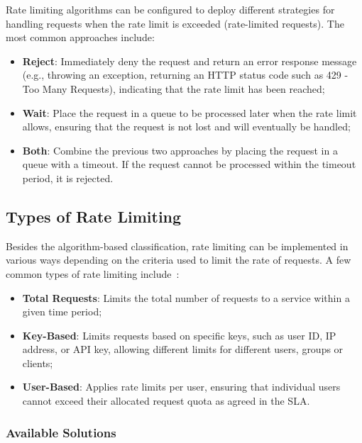 Rate limiting algorithms can be configured
to deploy different strategies for handling requests when the rate limit is exceeded
(rate-limited requests).
The most common approaches include:

\begin{itemize}
    \item \textbf{Reject}: Immediately deny the request and return an error response message (e.g., throwing an exception,
    returning an HTTP status code such as 429 - Too Many Requests), indicating that the rate limit has been reached;
    \item \textbf{Wait}: Place the request in a queue to be processed later when the rate limit allows, ensuring that the request is not lost and will eventually be handled;
    \item \textbf{Both}: Combine the previous two approaches by placing the request in a queue with a timeout.
    If the request cannot be processed within the timeout period, it is rejected.
\end{itemize}

\subsection{Types of Rate Limiting}\label{subsec:rate-limiter-types}

Besides the algorithm-based classification, rate limiting can be implemented in various ways depending on the criteria used to limit the rate of requests.
A few common types of rate limiting include~\cite{redis-rate-limiting}:
\begin{itemize}
    \item \textbf{Total Requests}: Limits the total number of requests to a service within a given time period;
    \item \textbf{Key-Based}: Limits requests based on specific keys, such as user ID, IP address, or API key,
    allowing different limits for different users, groups or clients;
    \item \textbf{User-Based}: Applies rate limits per user,
    ensuring that individual users cannot exceed their allocated request quota as agreed in the SLA.
\end{itemize}

\subsubsection{Available Solutions}\label{subsubsec:rate-limiter-solutions}

